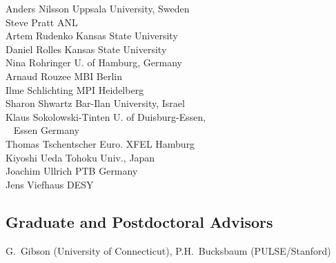 {\begin{multicols}{2}
	Anders Nilsson \hfill Uppsala University, Sweden\\
	Steve Pratt \hfill ANL\\
	Artem Rudenko \hfill Kansas State University\\
	Daniel Rolles \hfill Kansas State University\\
	Nina Rohringer \hfill U. of Hamburg, Germany\\
	Arnaud Rouzee \hfill MBI Berlin\\
	Ilme Schlichting \hfill MPI Heidelberg\\
	Sharon Shwartz \hfill Bar-Ilan University, Israel\\
	Klaus Sokolowski-Tinten \hfill U. of Duisburg-Essen,\\\mbox{ } \hfill Essen Germany\\
	Thomas Tschentscher \hfill Euro. XFEL Hamburg\\
	Kiyoshi Ueda \hfill Tohoku Univ., Japan\\
	Joachim Ullrich \hfill PTB Germany\\
	Jens Viefhaus \hfill DESY
\end{multicols}
}
\normalsize
\subsection*{Graduate and Postdoctoral Advisors}
G.~Gibson (University of Connecticut), P.H.~Bucksbaum (PULSE/Stanford)





